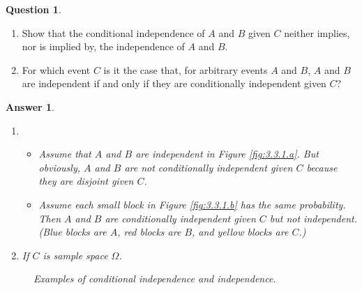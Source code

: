 \documentclass[utf8]{article}
\theoremstyle{definition}%
\newtheorem{question}{Question} %
\theoremstyle{plain}%
\newtheorem{answer}{Answer} %
\begin{document}
\begin{question} ~
    \begin{enumerate}[label=(\alph*)]
        \item Show that the conditional independence of $A$ and $B$ given $C$ neither implies, nor is implied by, the independence of $A$ and $B$.
        \item For which event $C$ is it the case that, for arbitrary events $A$ and $B$, $A$ and $B$ are independent if and only if they are conditionally independent given $C$?
    \end{enumerate}
\end{question}
\begin{answer} ~
    \begin{enumerate}[label=(\alph*)]
        \item 
            \begin{itemize}
                \item Assume that $A$ and $B$ are independent in Figure \ref{fig:3.3.1.a}. But obviously, $A$ and $B$ are not conditionally independent given $C$ because they are disjoint given $C$.
                \item Assume each small block in Figure \ref{fig:3.3.1.b} has the same probability. Then $A$ and $B$ are conditionally independent given $C$ but not independent. (Blue blocks are $A$, red blocks are $B$, and yellow blocks are $C$.)
            \end{itemize}
        \item If $C$ is sample space $\Omega$.
    \end{enumerate}
    \begin{figure}[H]
        \centering
        \quad
        \caption{Examples of conditional independence and independence.}
        \label{fig:3.3.1}
    \end{figure}
\end{answer}
\end{document}
